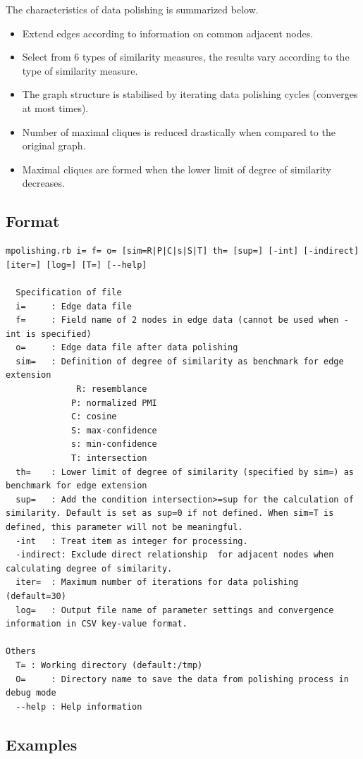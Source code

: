 The characteristics of data polishing is summarized below. 
\begin{itemize}
\item Extend edges according to information on common adjacent nodes. 
\item Select from 6 types of similarity measures, the results vary according to the type of similarity measure. 
\item The graph structure is stabilised by iterating data polishing cycles (converges at most times). 
\item Number of maximal cliques is reduced drastically when compared to the original graph. 
\item Maximal cliques are formed when the lower limit of degree of similarity decreases. 
\end{itemize}


\subsection{Format}
\begin{verbatim}
mpolishing.rb i= f= o= [sim=R|P|C|s|S|T] th= [sup=] [-int] [-indirect] [iter=] [log=] [T=] [--help]

  Specification of file 
  i=     : Edge data file
  f=     : Field name of 2 nodes in edge data (cannot be used when -int is specified)
  o=     : Edge data file after data polishing
  sim=   : Definition of degree of similarity as benchmark for edge extension  
              R: resemblance
             P: normalized PMI
             C: cosine
             S: max-confidence
             s: min-confidence
             T: intersection
  th=    : Lower limit of degree of similarity (specified by sim=) as benchmark for edge extension 
  sup=   : Add the condition intersection>=sup for the calculation of similarity. Default is set as sup=0 if not defined. When sim=T is defined, this parameter will not be meaningful. 
  -int   : Treat item as integer for processing. 
  -indirect: Exclude direct relationship  for adjacent nodes when calculating degree of similarity. 
  iter=  : Maximum number of iterations for data polishing (default=30)
  log=   : Output file name of parameter settings and convergence information in CSV key-value format. 

Others
  T= : Working directory (default:/tmp)
  O=     : Directory name to save the data from polishing process in debug mode 
  --help : Help information 
\end{verbatim}

\subsection{Examples}



